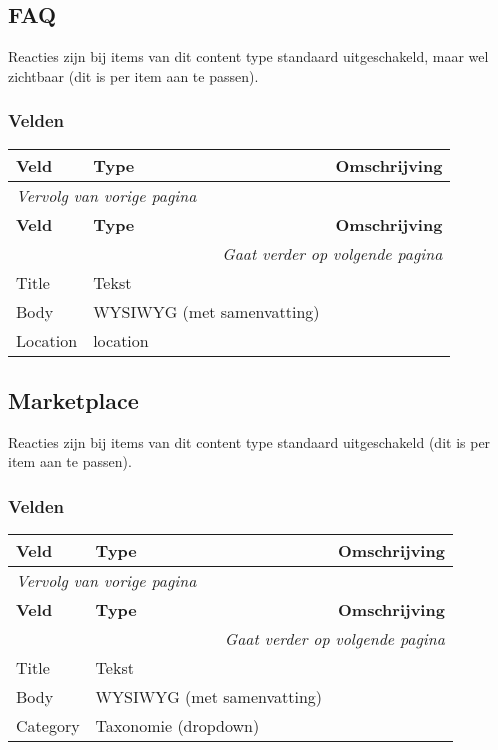 \subsection{FAQ}
\label{sec:content-faq}
Reacties zijn bij items van dit content type standaard uitgeschakeld, maar wel zichtbaar (dit is per item aan te passen).

\subsubsection{Velden}
  \begin{longtable}{| p{3.75cm}|p{3.75cm}|p{7.50cm}|}
  \hline
  \rowcolor{tableheader}
  \textbf{Veld} & \textbf{Type} & \textbf{Omschrijving}  \tabularnewline
  \hline
\endfirsthead
\multicolumn{3}{l}{\textit{Vervolg van vorige pagina}} \\
\hline
\rowcolor{tableheader}
  \textbf{Veld} & \textbf{Type} & \textbf{Omschrijving}  \tabularnewline
  \hline
\hline
\endhead
\multicolumn{3}{r}{\textit{Gaat verder op volgende pagina}} \\
\endfoot
\hline
\endlastfoot
  \raggedright{Title} & \raggedright{Tekst} & \raggedright{}  \tabularnewline
  \hline
  \raggedright{Body} & \raggedright{WYSIWYG (met samenvatting)} & \raggedright{}  \tabularnewline
  \hline
  \raggedright{Location} & \raggedright{location} & \raggedright{}  \tabularnewline
  \hline
  \end{longtable}

\subsection{Marketplace}
\label{sec:content-marketplace}
Reacties zijn bij items van dit content type standaard uitgeschakeld (dit is per item aan te passen).

\subsubsection{Velden}
  \begin{longtable}{| p{3.75cm}|p{3.75cm}|p{7.50cm}|}
  \hline
  \rowcolor{tableheader}
  \textbf{Veld} & \textbf{Type} & \textbf{Omschrijving}  \tabularnewline
  \hline
\endfirsthead
\multicolumn{3}{l}{\textit{Vervolg van vorige pagina}} \\
\hline
\rowcolor{tableheader}
  \textbf{Veld} & \textbf{Type} & \textbf{Omschrijving}  \tabularnewline
  \hline
\hline
\endhead
\multicolumn{3}{r}{\textit{Gaat verder op volgende pagina}} \\
\endfoot
\hline
\endlastfoot
  \raggedright{Title} & \raggedright{Tekst} & \raggedright{}  \tabularnewline
  \hline
  \raggedright{Body} & \raggedright{WYSIWYG (met samenvatting)} & \raggedright{}  \tabularnewline
  \hline
  \raggedright{Category} & \raggedright{Taxonomie (dropdown)} & \raggedright{}  \tabularnewline
  \hline
  \end{longtable}

